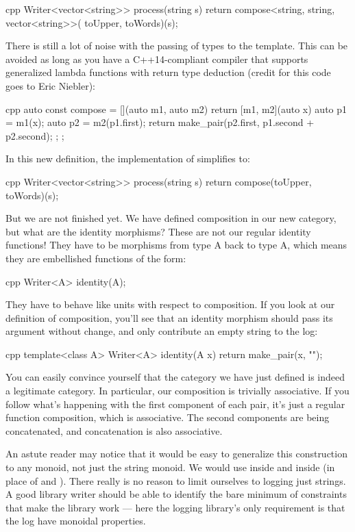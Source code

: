 \begin{snip}{cpp}
Writer<vector<string>> process(string s) {
    return compose<string, string, vector<string>>(
        toUpper, toWords)(s);
}
\end{snip}
There is still a lot of noise with the passing of types to the
 template. This can be avoided as long as you have a
C++14-compliant compiler that supports generalized lambda functions with
return type deduction (credit for this code goes to Eric Niebler):

\begin{snip}{cpp}
auto const compose = [](auto m1, auto m2) {
    return [m1, m2](auto x) {
        auto p1 = m1(x);
        auto p2 = m2(p1.first);
        return make_pair(p2.first, p1.second + p2.second);
    };
};
\end{snip}
In this new definition, the implementation of 
simplifies to:

\begin{snip}{cpp}
Writer<vector<string>> process(string s) {
    return compose(toUpper, toWords)(s);
}
\end{snip}
But we are not finished yet. We have defined composition in our new
category, but what are the identity morphisms? These are not our regular
identity functions! They have to be morphisms from type A back to type
A, which means they are embellished functions of the form:

\begin{snip}{cpp}
Writer<A> identity(A);
\end{snip}
They have to behave like units with respect to composition. If you look
at our definition of composition, you'll see that an identity morphism
should pass its argument without change, and only contribute an empty
string to the log:

\begin{snip}{cpp}
template<class A> Writer<A> identity(A x) {
    return make_pair(x, "");
}
\end{snip}
You can easily convince yourself that the category we have just defined
is indeed a legitimate category. In particular, our composition is
trivially associative. If you follow what's happening with the first
component of each pair, it's just a regular function composition, which
is associative. The second components are being concatenated, and
concatenation is also associative.

An astute reader may notice that it would be easy to generalize this
construction to any monoid, not just the string monoid. We would use
 inside  and  inside
 (in place of \code{+} and ). There really
is no reason to limit ourselves to logging just strings. A good library
writer should be able to identify the bare minimum of constraints that
make the library work --- here the logging library's only requirement is
that the log have monoidal properties.

